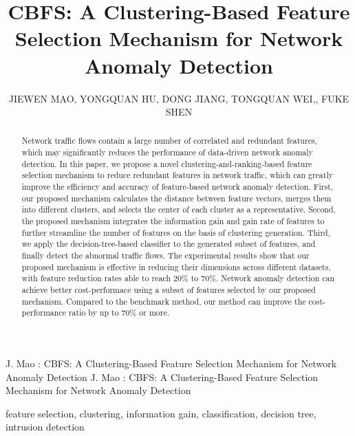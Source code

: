 \documentclass{ieeeaccess}
\theoremstyle{definition}
\begin{document}

\title{CBFS: A Clustering-Based Feature Selection Mechanism for Network Anomaly Detection}
\author{
    \uppercase{Jiewen Mao},
    \uppercase{Yongquan Hu},
    \uppercase{Dong Jiang},
    \uppercase{Tongquan Wei},, \uppercase{Fuke Shen}}
\address{School of Computer Science and Technology, East China Normal University, Shanghai 200062, China}

\markboth
{J. Mao \headeretal: CBFS: A Clustering-Based Feature Selection Mechanism for Network Anomaly Detection}
{J. Mao \headeretal: CBFS: A Clustering-Based Feature Selection Mechanism for Network Anomaly Detection}


\begin{abstract}
Network traffic flows contain a large number of correlated and redundant features, which may significantly reduces the performance of data-driven network anomaly detection.
In this paper, we propose a novel clustering-and-ranking-based feature selection mechanism to reduce redundant features in network traffic, which can greatly improve the efficiency and accuracy of feature-based network anomaly detection. 
First, our proposed mechanism calculates the distance between feature vectors, merges them into different clusters, and selects the center of each cluster as a representative.
Second, the proposed mechanism integrates the information gain and gain rate of features to further streamline the number of features on the basis of clustering generation.
Third, we apply the decision-tree-based classifier to the generated subset of features, and finally detect the abnormal traffic flows.
The experimental results show that our proposed mechanism is effective in reducing their dimensions across different datasets, with feature reduction rates able to reach 20\% to 70\%. Network anomaly detection can achieve better cost-performace using a subset of features selected by our proposed mechanism. Compared to the benchmark method, our method can improve the cost-performance ratio by up to 70\% or more.
\end{abstract}

\begin{keywords}
    feature selection, clustering, information gain, classification, decision tree, intrusion detection
\end{keywords}
\end{document}
